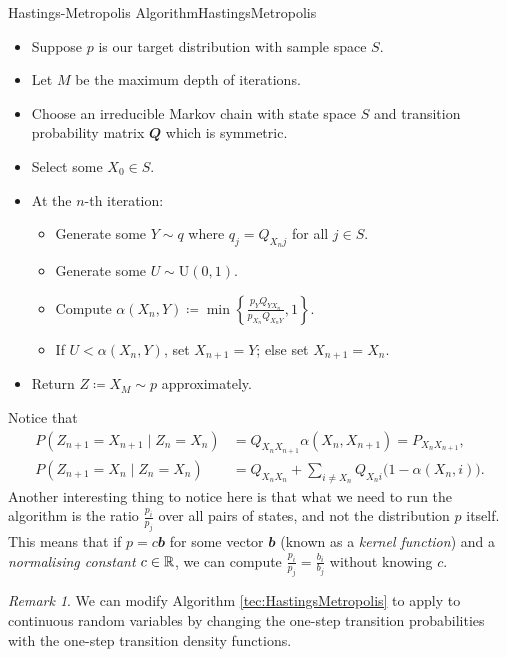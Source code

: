\documentclass[math, code]{amznotes}
\theoremstyle{remark}
\newtheorem*{remark}{Remark}
\begin{document}
\begin{tecbox}{Hastings-Metropolis Algorithm}{HastingsMetropolis}
    \begin{itemize}
        \item Suppose $p$ is our target distribution with sample space $S$.
        \item Let $M$ be the maximum depth of iterations.
        \item Choose an irreducible Markov chain with state space $S$ and transition probability matrix $\mathbfit{Q}$ which is symmetric.
        \item Select some $X_0 \in S$.
        \item At the $n$-th iteration:
        \begin{itemize}
            \item Generate some $Y \sim q$ where $q_j = Q_{X_nj}$ for all $j \in S$.
            \item Generate some $U \sim \mathrm{U}\left(0, 1\right)$.
            \item Compute $\alpha\left(X_n, Y\right) \coloneqq \min\left\{\frac{p_YQ_{YX_n}}{p_{X_n}Q_{X_nY}}, 1\right\}$.
            \item If $U < \alpha\left(X_n, Y\right)$, set $X_{n + 1} = Y$; else set $X_{n + 1} = X_n$.
        \end{itemize}
        \item Return $Z \coloneqq X_M \sim p$ approximately.
    \end{itemize}
\end{tecbox}
Notice that 
\begin{align*}
    P\left(Z_{n + 1} = X_{n + 1} \mid Z_n = X_n\right) & = Q_{X_nX_{n + 1}}\alpha\left(X_n, X_{n + 1}\right) = P_{X_nX_{n + 1}}, \\
    P\left(Z_{n + 1} = X_n \mid Z_n = X_n\right) & = Q_{X_nX_n} + \sum_{i \neq X_n}Q_{X_ni}\bigl(1 - \alpha\left(X_n, i\right)\bigr).
\end{align*}
Another interesting thing to notice here is that what we need to run the algorithm is the ratio $\frac{p_i}{p_j}$ over all pairs of states, and not the distribution $p$ itself. This means that if $p = c\mathbfit{b}$ for some vector $\mathbfit{b}$ (known as a \textit{kernel function}) and a \textit{normalising constant} $c \in \mathbb{R}$, we can compute $\frac{p_i}{p_j} = \frac{b_i}{b_j}$ without knowing $c$.
\begin{notebox}
    \begin{remark}
        We can modify Algorithm \ref{tec:HastingsMetropolis} to apply to continuous random variables by changing the one-step transition probabilities with the one-step transition density functions.
    \end{remark}
\end{notebox}
\end{document}

